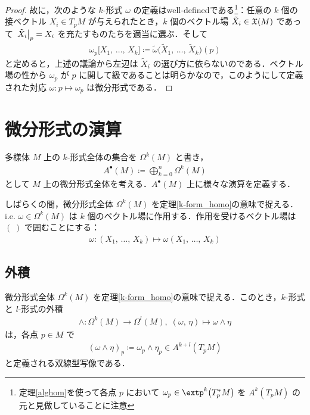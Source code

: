 \documentclass[geometry_main]{subfiles}
\begin{document}
\begin{proof}
	故に，次のような $k$-形式 $\omega$ の定義はwell-definedである\footnote{定理\ref{alghom}を使って各点 $p$ において $\omega_p \in \extp^k\bigl(T^*_pM\bigr)$ を $A^k(T_pM)$ の元と見做していることに注意}：任意の $k$ 個の接ベクトル $X_i \in T_pM$ が与えられたとき，$k$ 個のベクトル場 $\tilde{X}_i \in \mathfrak{X}(M)$ であって $\eval{\tilde{X}_i}_p = X_i$ を充たすものたちを適当に選ぶ．そして
	\begin{align} 
		\omega_p \bigl[ X_1,\, \dots ,\, X_k \bigr] \coloneqq \tilde{\omega} \bigl( \tilde{X}_1 ,\, \dots ,\, \tilde{X}_k \bigr) (p)
	\end{align}
	と定めると，上述の議論から左辺は $\tilde{X}_i$ の選び方に依らないのである．ベクトル場の\cinfty 性から $\omega_p$ が $p$ に関して\cinfty 級であることは明らかなので，このようにして定義された対応 $\omega \colon p \mapsto \omega_p$ は微分形式である．
\end{proof}


\section{微分形式の演算}

\cinfty 多様体 $M$ 上の $k$-形式全体の集合を $\Omega^k(M)$ と書き，
\begin{align} 
	A^\bullet(M) \coloneqq \bigoplus_{k=0}^n \Omega^k(M)
\end{align}
として $M$ 上の微分形式全体を考える．$A^\bullet(M)$ 上に様々な演算を定義する．
\begin{marker}		 
	しばらくの間，微分形式全体 $\Omega^k(M)$ を定理\ref{k-form_homo}の意味で捉える．i.e. $\omega \in \Omega^k(M)$ は $k$ 個のベクトル場に作用する．作用を受けるベクトル場は $(\;)$ で囲むことにする：
	\begin{align} 
		\omega \colon (X_1,\, \dots ,\, X_k) \mapsto \omega(X_1,\, \dots ,\, X_k)
	\end{align}
\end{marker}		

\subsection{外積}

微分形式全体 $\Omega^k(M)$ を定理\ref{k-form_homo}の意味で捉える．このとき，$k$-形式と $l$-形式の外積 
\begin{align} 
	\wedge \colon \Omega^k(M) \to \Omega^l(M),\; (\omega,\, \eta) \mapsto \omega \wedge \eta
\end{align}
は，各点 $p \in M$ で
\begin{align} 
	(\omega \wedge \eta)_p \coloneqq \omega_p \wedge \eta_p \in A^{k+l}(T_p M)
\end{align}
と定義される双線型写像である．
\end{document}
